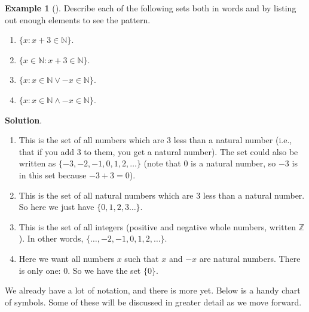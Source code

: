 \documentclass[10pt,]{book}
\theoremstyle{plain}
\theoremstyle{definition}
\theoremstyle{definition}
\newtheorem{example}[theorem]{Example}
\theoremstyle{definition}
\theoremstyle{definition}
\numberwithin{equation}{chapter}
\def\N{\mathbb N}
\def\Z{\mathbb Z}
\def\st{:}
\begin{document}
\begin{example}[]\label{example-39}
\hypertarget{p-1554}{}%
Describe each of the following sets both in words and by listing out enough elements to see the pattern.%
\par
\hypertarget{p-1555}{}%
\leavevmode%
\begin{enumerate}
\item\hypertarget{li-405}{}\(\{x \st x + 3 \in \N\}\).%
\item\hypertarget{li-406}{}\(\{x \in \N \st x + 3 \in \N\}\).%
\item\hypertarget{li-407}{}\(\{x \st x \in \N \vee -x \in \N\}\).%
\item\hypertarget{li-408}{}\(\{x \st x \in \N \wedge -x \in \N\}\).%
\end{enumerate}
%
\par\smallskip%
\noindent\textbf{Solution}.\hypertarget{solution-130}{}\quad%
\hypertarget{p-1556}{}%
\leavevmode%
\begin{enumerate}
\item\hypertarget{li-409}{}\hypertarget{p-1557}{}%
This is the set of all numbers which are 3 less than a natural number (i.e., that if you add 3 to them, you get a natural number). The set could also be written as \(\{-3, -2, -1, 0, 1, 2, \ldots\}\) (note that 0 is a natural number, so \(-3\) is in this set because \(-3 + 3 = 0\)).%
\item\hypertarget{li-410}{}\hypertarget{p-1558}{}%
This is the set of all natural numbers which are 3 less than a natural number. So here we just have \(\{0, 1, 2,3 \ldots\}\).%
\item\hypertarget{li-411}{}\hypertarget{p-1559}{}%
This is the set of all integers  (positive and negative whole numbers, written \(\Z\)). In other words, \(\{\ldots, -2, -1, 0, 1, 2, \ldots\}\).%
\item\hypertarget{li-412}{}\hypertarget{p-1560}{}%
Here we want all numbers \(x\) such that \(x\) and \(-x\) are natural numbers. There is only one: 0. So we have the set \(\{0\}\).%
\end{enumerate}
%
\end{example}
\hypertarget{p-1561}{}%
We already have a lot of notation, and there is more yet. Below is a handy chart of symbols. Some of these will be discussed in greater detail as we move forward.%
\end{document}
